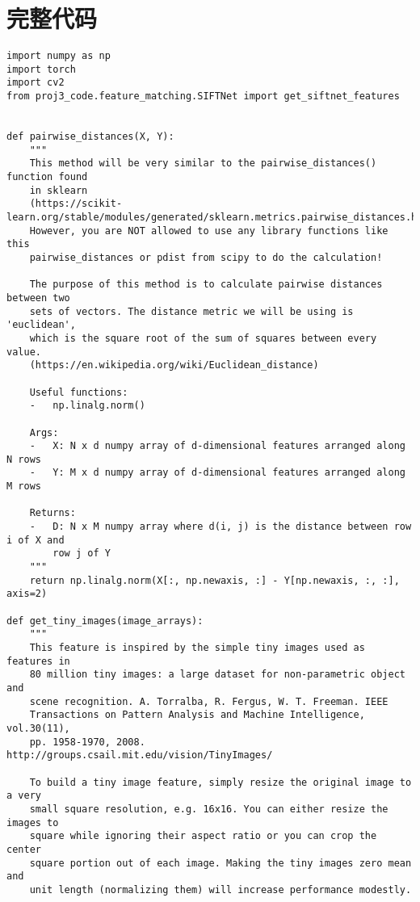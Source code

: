 \appendix

\section{完整代码}

\label{appendix:code}

\begin{lstlisting}[style=Python]
import numpy as np
import torch
import cv2
from proj3_code.feature_matching.SIFTNet import get_siftnet_features


def pairwise_distances(X, Y):
    """
    This method will be very similar to the pairwise_distances() function found
    in sklearn
    (https://scikit-learn.org/stable/modules/generated/sklearn.metrics.pairwise_distances.html)
    However, you are NOT allowed to use any library functions like this
    pairwise_distances or pdist from scipy to do the calculation!

    The purpose of this method is to calculate pairwise distances between two
    sets of vectors. The distance metric we will be using is 'euclidean',
    which is the square root of the sum of squares between every value.
    (https://en.wikipedia.org/wiki/Euclidean_distance)

    Useful functions:
    -   np.linalg.norm()

    Args:
    -   X: N x d numpy array of d-dimensional features arranged along N rows
    -   Y: M x d numpy array of d-dimensional features arranged along M rows

    Returns:
    -   D: N x M numpy array where d(i, j) is the distance between row i of X and
        row j of Y
    """
    return np.linalg.norm(X[:, np.newaxis, :] - Y[np.newaxis, :, :], axis=2)

def get_tiny_images(image_arrays):
    """
    This feature is inspired by the simple tiny images used as features in
    80 million tiny images: a large dataset for non-parametric object and
    scene recognition. A. Torralba, R. Fergus, W. T. Freeman. IEEE
    Transactions on Pattern Analysis and Machine Intelligence, vol.30(11),
    pp. 1958-1970, 2008. http://groups.csail.mit.edu/vision/TinyImages/

    To build a tiny image feature, simply resize the original image to a very
    small square resolution, e.g. 16x16. You can either resize the images to
    square while ignoring their aspect ratio or you can crop the center
    square portion out of each image. Making the tiny images zero mean and
    unit length (normalizing them) will increase performance modestly.


\end{lstlisting}
